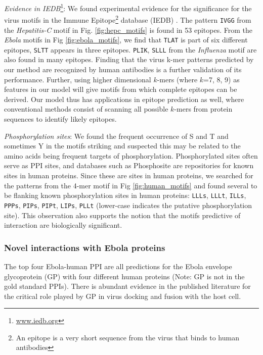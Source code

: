 \documentclass[runningheads,a4paper]{llncs}
\begin{document}
\noindent\emph{Evidence in IEDB}\footnote{\url{www.iedb.org}}:
We found experimental evidence for the significance for the virus motifs in the Immune Epitope\footnote{An epitope is a very short sequence from the virus that binds to human antibodies} database (IEDB) \citep{iedb}.
The pattern \texttt{IVGG} from the \textit{Hepatitis-C} motif in Fig. \ref{fig:hepc_motifs} is found in 53 epitopes.
From the \textit{Ebola} motifs in Fig \ref{fig:ebola_motifs}, we find that \texttt{TLAT} is part of six different epitopes, \texttt{SLTT} appears in three epitopes. \texttt{PLIK}, \texttt{SLLL} from the \textit{Influenza} motif are also found in many epitopes.
Finding that the virus k-mer patterns predicted by our method are recognized by human antibodies
is a further validation of its performance.
Further, using higher dimensional $k$-mers (where $k$=7, 8, 9) as
features in our model will give motifs from which complete epitopes can be derived. %
Our model thus has applications in epitope prediction as well, where conventional methods consist of scanning all possible $k$-mers from protein sequences to identify likely epitopes.
 
\noindent\emph{Phosphorylation sites}: 
We found the frequent occurrence of S and T and sometimes Y in the motifs striking and suspected this may be
related to the amino acids being frequent targets of phosphorylation.
Phosphorylated sites often serve as PPI sites, and databases such as Phosphosite \citep{phosphosite} are
 repositories for known sites in human proteins. Since these are sites in human proteins, we searched for the patterns
from the 4-mer motif in Fig \ref{fig:human_motifs} and found several to be flanking known phosphorylation sites in human proteins:
\texttt{LLLs}, \texttt{LLLt}, \texttt{ILLs}, \texttt{PPPs}, \texttt{PIPs}, \texttt{PIPt}, \texttt{LIPs}, \texttt{PLLt} (lower-case indicates the putative phosphorylation site). This observation also supports the notion that the motifs predictive
of interaction are biologically significant.


\subsubsection{Novel interactions with Ebola proteins}
The top four Ebola-human PPI are all predictions for the Ebola envelope glycoprotein (GP) with four different human proteins (Note: GP is not in the gold standard PPIs). There is abundant evidence in the published literature \citep{nanbo2010} for the critical role played by GP in virus docking and fusion with the host cell.
\end{document}
